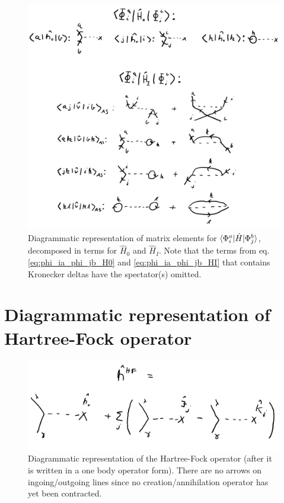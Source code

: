 \documentclass{article}
\newcommand{\inner}[3]{\braket{#1|#2|#3}}
\begin{document}
\begin{appendix}
    \begin{figure}[H]
        \centering
        \includegraphics[width=\linewidth]{1p1h_croped.pdf}
        \caption{Diagrammatic representation of matrix elements for $\inner{\Phi_i^a}{\hat{H}}{\Phi_j^b}$, decomposed in terms for $\hat{H}_0$ and $\hat{H}_I$. Note that the terms from eq. \eqref{eq:phi_ia_phi_jb_H0} and \eqref{eq:phi_ia_phi_jb_HI} that contains Kronecker deltas have the spectator(s) omitted.}\label{fig:1p1h}
    \end{figure}

    \section{Diagrammatic representation of Hartree-Fock operator}\label{sec:app:HF_dia}
    \begin{figure}[H]
        \centering
        \includegraphics[width=\linewidth]{hafo_cropped.pdf}
        \caption{Diagrammatic representation of the Hartree-Fock operator (after it is written in a one body operator form). There are no arrows on ingoing/outgoing lines since no creation/annihilation operator has yet been contracted.}\label{fig:HF}
    \end{figure}
\end{appendix}
\end{document}
